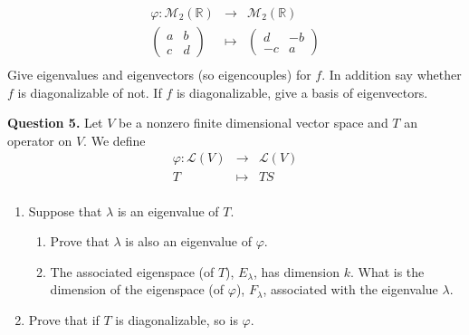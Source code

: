 \documentclass[11pt]{amsart}
\begin{document}
$$
\begin{array}{rcl}
\varphi: \mathcal{M}_2(\mathbb{R})& \rightarrow &\mathcal{M}_2(\mathbb{R}) \\
\left(\begin{array}{cc}a&b\\c&d\end{array}\right) &\mapsto &
\left(\begin{array}{cc}d&-b\\-c&a\end{array}\right)\\
\end{array}
$$
Give eigenvalues and eigenvectors (so eigencouples) for $f$. 
In addition
say whether $f$ is diagonalizable of not. If $f$ is diagonalizable, give a basis of eigenvectors.


\newpage \noindent
{\bf Question 5.} 
Let $V$ be a nonzero finite dimensional vector space and $T$ an operator on $V$. 
We define
$$
\begin{array}{rcl}
\varphi: \mathcal{L}(V)& \rightarrow &\mathcal{L}(V) \\
T &\mapsto &TS\\
\end{array}
$$
\begin{enumerate}[label=(\alph*)]
\item Suppose that $\lambda$ is an eigenvalue of $T$.
\begin{enumerate}[label=(\alph*)]
\item
 Prove that $\lambda$ is also an eigenvalue of $\varphi$.
\item
The associated eigenspace (of $T$), $E_\lambda$, has dimension $k$.
What is the dimension of the eigenspace (of $\varphi$), $F_\lambda$, associated with the eigenvalue $\lambda$.
\end{enumerate}
\item Prove that if $T$ is diagonalizable, so is $\varphi$.
\end{enumerate}
\end{document}
